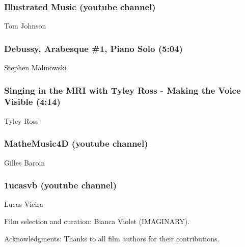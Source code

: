 \subsubsection*{Illustrated Music (youtube channel)}
Tom Johnson

\subsubsection*{Debussy, Arabesque \#1, Piano Solo (5:04)}
Stephen Malinowski

\subsubsection*{Singing in the MRI with Tyley Ross - Making the Voice Visible (4:14)}
Tyley Ross

\subsubsection*{MatheMusic4D (youtube channel)}
Gilles Baroin

\subsubsection*{1ucasvb (youtube channel)}
Lucas Vieira

\begin{sectcredits}
\item[Film selection and curation:] Bianca Violet (IMAGINARY).
\item[Acknowledgments:] Thanks to all film authors for their contributions.
\end{sectcredits}
